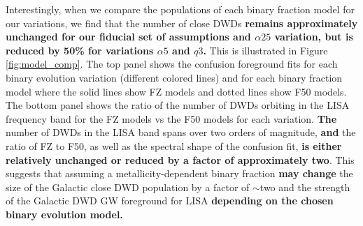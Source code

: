 \documentclass[twocolumn, linenumbers]{aastex631}
\begin{document}
Interestingly, when we compare the populations of each binary fraction model for our variations, we find that the number of close DWDs \textbf{remains approximately unchanged for our fiducial set of assumptions and $\alpha25$ variation, but is reduced by 50\% for variations $\alpha5$ and $q3$.} This is illustrated in Figure \ref{fig:model_comp}. The top panel shows the confusion foreground fits for each binary evolution variation (different colored lines) and for each binary fraction model where the solid lines show FZ models and dotted lines show F50 models. The bottom panel shows the ratio of the number of DWDs orbiting in the LISA frequency band for the FZ models vs the F50 models for each variation. \textbf{The} number of DWDs in the LISA band spans over two orders of magnitude, \textbf{and} the ratio of FZ to F50, as well as the spectral shape of the confusion fit, \textbf{is either relatively unchanged or reduced by a factor of approximately two}. This suggests that assuming a metallicity-dependent binary fraction \textbf{may change} the size of the Galactic close DWD population by a factor of $\sim$two and the strength of the Galactic DWD GW foreground for LISA \textbf{depending on the chosen binary evolution model.}
\end{document}
